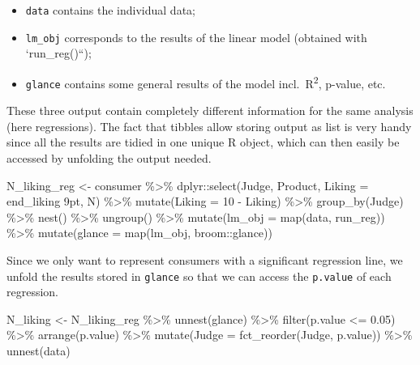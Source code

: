 \documentclass[
]{krantz}
\makeatletter
\newenvironment{Shaded}{\begin{snugshade}}{\end{snugshade}}
\newcommand{\AttributeTok}[1]{\textcolor[rgb]{0.61,0.61,0.61}{#1}}
\newcommand{\DecValTok}[1]{\textcolor[rgb]{0.06,0.06,0.06}{#1}}
\newcommand{\FloatTok}[1]{\textcolor[rgb]{0.06,0.06,0.06}{#1}}
\newcommand{\FunctionTok}[1]{\textcolor[rgb]{0,0,0}{#1}}
\newcommand{\NormalTok}[1]{#1}
\newcommand{\OtherTok}[1]{\textcolor[rgb]{0.37,0.37,0.37}{#1}}
\newcommand{\SpecialCharTok}[1]{\textcolor[rgb]{0,0,0}{#1}}
\newcommand{\StringTok}[1]{\textcolor[rgb]{0.5,0.5,0.5}{#1}}
\providecommand{\tightlist}{%
  \setlength{\itemsep}{0pt}\setlength{\parskip}{0pt}}
\renewenvironment{quote}{\begin{VF}}{\end{VF}}
\newenvironment{kframe}{%
\medskip{}
\setlength{\fboxsep}{.8em}
 \def\at@end@of@kframe{}%
 \ifinner\ifhmode%
  \def\at@end@of@kframe{\end{minipage}}%
  \begin{minipage}{\columnwidth}%
 \fi\fi%
 \def\FrameCommand##1{\hskip\@totalleftmargin \hskip-\fboxsep
 \colorbox{shadecolor}{##1}\hskip-\fboxsep
     \hskip-\linewidth \hskip-\@totalleftmargin \hskip\columnwidth}%
 \MakeFramed {\advance\hsize-\width
   \@totalleftmargin\z@ \linewidth\hsize
   \@setminipage}}%
 {\par\unskip\endMakeFramed%
 \at@end@of@kframe}
\renewenvironment{Shaded}{\begin{kframe}}{\end{kframe}}
\makeatother
\begin{document}
\begin{itemize}
\tightlist
\item
  \texttt{data} contains the individual data;
\item
  \texttt{lm\_obj} corresponds to the results of the linear model (obtained with `run\_reg()``);
\item
  \texttt{glance} contains some general results of the model incl.~R\textsuperscript{2}, p-value, etc.
\end{itemize}

\begin{quote}
These three output contain completely different information for the same analysis (here regressions). The fact that tibbles allow storing output as list is very handy since all the results are tidied in one unique R object, which can then easily be accessed by unfolding the output needed.
\end{quote}

\begin{Shaded}
\begin{Highlighting}[]
\NormalTok{N\_liking\_reg }\OtherTok{\textless{}{-}}\NormalTok{ consumer }\SpecialCharTok{\%\textgreater{}\%}
\NormalTok{  dplyr}\SpecialCharTok{::}\FunctionTok{select}\NormalTok{(Judge, Product, }\AttributeTok{Liking =} \StringTok{\textasciigrave{}}\AttributeTok{end\_liking 9pt}\StringTok{\textasciigrave{}}\NormalTok{, N) }\SpecialCharTok{\%\textgreater{}\%}
  \FunctionTok{mutate}\NormalTok{(}\AttributeTok{Liking =} \DecValTok{10} \SpecialCharTok{{-}}\NormalTok{ Liking) }\SpecialCharTok{\%\textgreater{}\%}
  \FunctionTok{group\_by}\NormalTok{(Judge) }\SpecialCharTok{\%\textgreater{}\%}
  \FunctionTok{nest}\NormalTok{() }\SpecialCharTok{\%\textgreater{}\%}
  \FunctionTok{ungroup}\NormalTok{() }\SpecialCharTok{\%\textgreater{}\%}
  \FunctionTok{mutate}\NormalTok{(}\AttributeTok{lm\_obj =} \FunctionTok{map}\NormalTok{(data, run\_reg)) }\SpecialCharTok{\%\textgreater{}\%}
  \FunctionTok{mutate}\NormalTok{(}\AttributeTok{glance =} \FunctionTok{map}\NormalTok{(lm\_obj, broom}\SpecialCharTok{::}\NormalTok{glance))}
\end{Highlighting}
\end{Shaded}

Since we only want to represent consumers with a significant regression line, we unfold the results stored in \texttt{glance} so that we can access the \texttt{p.value} of each regression.

\begin{Shaded}
\begin{Highlighting}[]
\NormalTok{N\_liking }\OtherTok{\textless{}{-}}\NormalTok{ N\_liking\_reg }\SpecialCharTok{\%\textgreater{}\%}
  \FunctionTok{unnest}\NormalTok{(glance) }\SpecialCharTok{\%\textgreater{}\%}
  \FunctionTok{filter}\NormalTok{(p.value }\SpecialCharTok{\textless{}=} \FloatTok{0.05}\NormalTok{) }\SpecialCharTok{\%\textgreater{}\%}
  \FunctionTok{arrange}\NormalTok{(p.value) }\SpecialCharTok{\%\textgreater{}\%}
  \FunctionTok{mutate}\NormalTok{(}\AttributeTok{Judge =} \FunctionTok{fct\_reorder}\NormalTok{(Judge, p.value)) }\SpecialCharTok{\%\textgreater{}\%}
  \FunctionTok{unnest}\NormalTok{(data)}
\end{Highlighting}
\end{Shaded}
\end{document}
